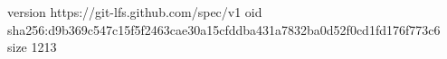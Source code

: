 version https://git-lfs.github.com/spec/v1
oid sha256:d9b369c547c15f5f2463cae30a15cfddba431a7832ba0d52f0cd1fd176f773c6
size 1213
